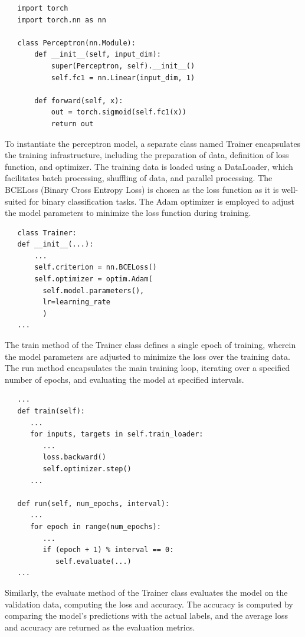 \documentclass[10pt,twocolumn,letterpaper]{article}
\begin{document}
\begin{lstlisting}
   import torch
   import torch.nn as nn
   
   class Perceptron(nn.Module):
       def __init__(self, input_dim):
           super(Perceptron, self).__init__()
           self.fc1 = nn.Linear(input_dim, 1)
       
       def forward(self, x):
           out = torch.sigmoid(self.fc1(x))
           return out

   \end{lstlisting}

To instantiate the perceptron model, a separate class named Trainer encapsulates the training infrastructure, including the preparation of data, definition of loss function, and optimizer. The training data is loaded using a DataLoader, which facilitates batch processing, shuffling of data, and parallel processing. The BCELoss (Binary Cross Entropy Loss) is chosen as the loss function as it is well-suited for binary classification tasks. The Adam optimizer is employed to adjust the model parameters to minimize the loss function during training.

\begin{lstlisting}
   class Trainer:
   def __init__(...):
       ...
       self.criterion = nn.BCELoss()
       self.optimizer = optim.Adam(
         self.model.parameters(), 
         lr=learning_rate
         )
   ...
   \end{lstlisting}

The train method of the Trainer class defines a single epoch of training, wherein the model parameters are adjusted to minimize the loss over the training data. The run method encapsulates the main training loop, iterating over a specified number of epochs, and evaluating the model at specified intervals.
\begin{lstlisting}
   ...
   def train(self):
      ...
      for inputs, targets in self.train_loader:
         ...
         loss.backward()
         self.optimizer.step()
      ...

   def run(self, num_epochs, interval):
      ...
      for epoch in range(num_epochs):
         ...
         if (epoch + 1) % interval == 0:
            self.evaluate(...)
   ...
   \end{lstlisting}
Similarly, the evaluate method of the Trainer class evaluates the model on the validation data, computing the loss and accuracy. The accuracy is computed by comparing the model's predictions with the actual labels, and the average loss and accuracy are returned as the evaluation metrics.
\end{document}
